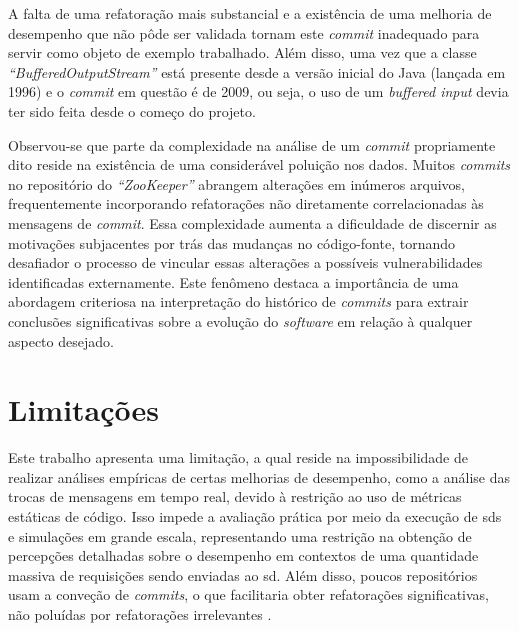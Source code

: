 A falta de uma refatoração mais substancial e a existência de uma melhoria de desempenho que não pôde ser validada tornam este \textit{commit} inadequado para servir como objeto de exemplo trabalhado. Além disso, uma vez que a classe \textit{``BufferedOutputStream''} está presente desde a versão inicial do Java (lançada em 1996) e o \textit{commit} em questão é de 2009, ou seja, o uso de um \textit{buffered input} devia ter sido feita desde o começo do projeto.


Observou-se que parte da complexidade na análise de um \textit{commit} propriamente dito reside na existência de uma considerável poluição nos dados. Muitos \textit{commits} no repositório do \textit{``ZooKeeper''} abrangem alterações em inúmeros arquivos, frequentemente incorporando refatorações não diretamente correlacionadas às mensagens de \textit{commit}. Essa complexidade aumenta a dificuldade de discernir as motivações subjacentes por trás das mudanças no código-fonte, tornando desafiador o processo de vincular essas alterações a possíveis vulnerabilidades identificadas externamente. Este fenômeno destaca a importância de uma abordagem criteriosa na interpretação do histórico de \textit{commits} para extrair conclusões significativas sobre a evolução do \textit{software} em relação à qualquer aspecto desejado.

\section{Limitações}
\label{sec:limitacoes}

Este trabalho apresenta uma limitação, a qual reside na impossibilidade de realizar análises empíricas de certas melhorias de desempenho, como a análise das trocas de mensagens em tempo real, devido à restrição ao uso de métricas estáticas de código. Isso impede a avaliação prática por meio da execução de \gls{sds} e simulações em grande escala, representando uma restrição na obtenção de percepções detalhadas sobre o desempenho em contextos de uma quantidade massiva de requisições sendo enviadas ao \gls{sd}. Além disso, poucos repositórios usam a conveção de \textit{commits}, o que facilitaria obter refatorações significativas, não poluídas por refatorações irrelevantes \cite{conventionalcommits}.